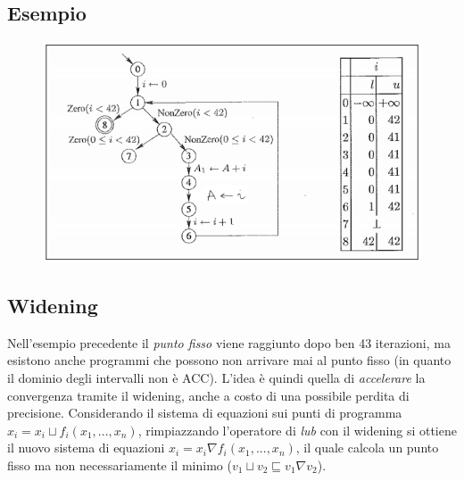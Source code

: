 \documentclass[a4paper,oneside,titlepage]{book}
\begin{document}
\subsection{Esempio}
\label{int4}
\begin{figure}[htp]
	\centering
	\includegraphics[width=\textwidth, height=\textheight, keepaspectratio]{int6.png}
\end{figure}

\subsection{Widening}
\label{int3}
Nell'esempio precedente il \textit{punto fisso} viene raggiunto dopo ben 43 iterazioni, ma esistono anche programmi che possono non arrivare mai al punto fisso (in quanto il dominio degli intervalli non è ACC). L'idea è quindi quella di \textit{accelerare} la convergenza tramite il widening, anche a costo di una possibile perdita di precisione. Considerando il sistema di equazioni sui punti di programma $x_i = x_i \sqcup f_i(x_1,...,x_n)$, rimpiazzando l'operatore di \textit{lub} con il widening si ottiene il nuovo sistema di equazioni $x_i = x_i \nabla f_i(x_1,...,x_n)$, il quale calcola un punto fisso ma non necessariamente il minimo ($v_1 \sqcup v_2 \sqsubseteq v_1 \nabla v_2$).
\end{document}
